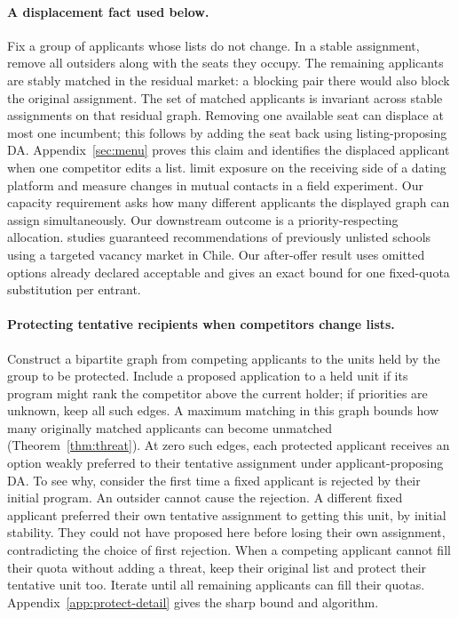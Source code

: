 \documentclass[format=acmsmall,review=false]{acmart}
\begin{document}
\paragraph{A displacement fact used below.} Fix a group of applicants whose lists do not change. In a stable assignment, remove all outsiders along with the seats they occupy. The remaining applicants are stably matched in the residual market: a blocking pair there would also block the original assignment. The set of matched applicants is invariant across stable assignments on that residual graph. Removing one available seat can displace at most one incumbent; this follows by adding the seat back using listing-proposing DA. Appendix~\ref{sec:menu} proves this claim and identifies the displaced applicant when one competitor edits a list.
\citet{sekiya2026} limit exposure on the receiving side of a dating platform and measure changes in mutual contacts in a field experiment. Our capacity requirement asks how many different applicants the displayed graph can assign simultaneously. Our downstream outcome is a priority-respecting allocation. \citet{lepesure} studies guaranteed recommendations of previously unlisted schools using a targeted vacancy market in Chile. Our after-offer result uses omitted options already declared acceptable and gives an exact bound for one fixed-quota substitution per entrant.

\paragraph{Protecting tentative recipients when competitors change lists.}
Construct a bipartite graph from competing applicants to the units held by the group to be protected. Include a proposed application to a held unit if its program might rank the competitor above the current holder; if priorities are unknown, keep all such edges. A maximum matching in this graph bounds how many originally matched applicants can become unmatched (Theorem~\ref{thm:threat}). At zero such edges, each protected applicant receives an option weakly preferred to their tentative assignment under applicant-proposing DA. To see why, consider the first time a fixed applicant is rejected by their initial program. An outsider cannot cause the rejection. A different fixed applicant preferred their own tentative assignment to getting this unit, by initial stability. They could not have proposed here before losing their own assignment, contradicting the choice of first rejection. When a competing applicant cannot fill their quota without adding a threat, keep their original list and protect their tentative unit too. Iterate until all remaining applicants can fill their quotas. Appendix~\ref{app:protect-detail} gives the sharp bound and algorithm.







\end{document}
